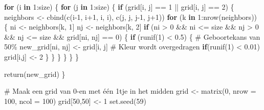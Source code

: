 \documentclass[
  a4paper,
]{scrbook}
\newenvironment{Shaded}{\begin{snugshade}}{\end{snugshade}}
\newcommand{\AttributeTok}[1]{\textcolor[rgb]{0.40,0.45,0.13}{#1}}
\newcommand{\CommentTok}[1]{\textcolor[rgb]{0.37,0.37,0.37}{#1}}
\newcommand{\ControlFlowTok}[1]{\textcolor[rgb]{0.00,0.23,0.31}{\textbf{#1}}}
\newcommand{\DecValTok}[1]{\textcolor[rgb]{0.68,0.00,0.00}{#1}}
\newcommand{\FloatTok}[1]{\textcolor[rgb]{0.68,0.00,0.00}{#1}}
\newcommand{\FunctionTok}[1]{\textcolor[rgb]{0.28,0.35,0.67}{#1}}
\newcommand{\NormalTok}[1]{\textcolor[rgb]{0.00,0.23,0.31}{#1}}
\newcommand{\OtherTok}[1]{\textcolor[rgb]{0.00,0.23,0.31}{#1}}
\newcommand{\SpecialCharTok}[1]{\textcolor[rgb]{0.37,0.37,0.37}{#1}}
\theoremstyle{definition}
\theoremstyle{remark}
\begin{document}
\begin{Shaded}
\begin{Highlighting}[]
  \ControlFlowTok{for}\NormalTok{ (i }\ControlFlowTok{in} \DecValTok{1}\SpecialCharTok{:}\NormalTok{size) \{}
    \ControlFlowTok{for}\NormalTok{ (j }\ControlFlowTok{in} \DecValTok{1}\SpecialCharTok{:}\NormalTok{size) \{}
      \ControlFlowTok{if}\NormalTok{ (grid[i, j] }\SpecialCharTok{==} \DecValTok{1} \SpecialCharTok{||}\NormalTok{ grid[i, j] }\SpecialCharTok{==} \DecValTok{2}\NormalTok{) \{}
\NormalTok{        neighbors }\OtherTok{\textless{}{-}} \FunctionTok{cbind}\NormalTok{(}\FunctionTok{c}\NormalTok{(i}\DecValTok{{-}1}\NormalTok{, i}\SpecialCharTok{+}\DecValTok{1}\NormalTok{, i, i), }\FunctionTok{c}\NormalTok{(j, j, j}\DecValTok{{-}1}\NormalTok{, j}\SpecialCharTok{+}\DecValTok{1}\NormalTok{))}
        \ControlFlowTok{for}\NormalTok{ (k }\ControlFlowTok{in} \DecValTok{1}\SpecialCharTok{:}\FunctionTok{nrow}\NormalTok{(neighbors)) \{}
\NormalTok{          ni }\OtherTok{\textless{}{-}}\NormalTok{ neighbors[k, }\DecValTok{1}\NormalTok{]}
\NormalTok{          nj }\OtherTok{\textless{}{-}}\NormalTok{ neighbors[k, }\DecValTok{2}\NormalTok{]}
          \ControlFlowTok{if}\NormalTok{ (ni }\SpecialCharTok{\textgreater{}} \DecValTok{0} \SpecialCharTok{\&\&}\NormalTok{ ni }\SpecialCharTok{\textless{}=}\NormalTok{ size }\SpecialCharTok{\&\&}\NormalTok{ nj }\SpecialCharTok{\textgreater{}} \DecValTok{0} \SpecialCharTok{\&\&}\NormalTok{ nj }\SpecialCharTok{\textless{}=}\NormalTok{ size }\SpecialCharTok{\&\&}\NormalTok{ grid[ni, nj] }\SpecialCharTok{==} \DecValTok{0}\NormalTok{) \{}
            \ControlFlowTok{if}\NormalTok{ (}\FunctionTok{runif}\NormalTok{(}\DecValTok{1}\NormalTok{) }\SpecialCharTok{\textless{}} \FloatTok{0.5}\NormalTok{) \{  }\CommentTok{\# Geboortekans van 50\%}
\NormalTok{              new\_grid[ni, nj] }\OtherTok{\textless{}{-}}\NormalTok{ grid[i, j]  }\CommentTok{\# Kleur wordt overgedragen}
              \ControlFlowTok{if}\NormalTok{(}\FunctionTok{runif}\NormalTok{(}\DecValTok{1}\NormalTok{) }\SpecialCharTok{\textless{}} \FloatTok{0.01}\NormalTok{) grid[i,j] }\OtherTok{\textless{}{-}} \DecValTok{2}
\NormalTok{            \}}
\NormalTok{          \}}
\NormalTok{        \}}
\NormalTok{      \}}
\NormalTok{    \}}
\NormalTok{  \}}
  
  \FunctionTok{return}\NormalTok{(new\_grid)}
\NormalTok{\}}

\CommentTok{\# Maak een grid van 0{-}en met één 1tje in het midden}
\NormalTok{grid }\OtherTok{\textless{}{-}} \FunctionTok{matrix}\NormalTok{(}\DecValTok{0}\NormalTok{, }\AttributeTok{nrow =} \DecValTok{100}\NormalTok{, }\AttributeTok{ncol =} \DecValTok{100}\NormalTok{)}
\NormalTok{grid[}\DecValTok{50}\NormalTok{,}\DecValTok{50}\NormalTok{] }\OtherTok{\textless{}{-}} \DecValTok{1}
\FunctionTok{set.seed}\NormalTok{(}\DecValTok{59}\NormalTok{)}


\end{Highlighting}
\end{Shaded}
\end{document}

